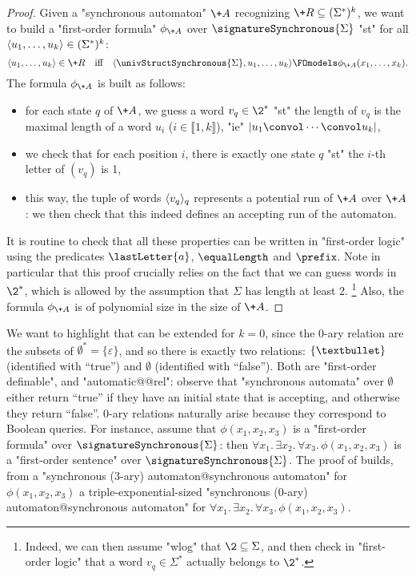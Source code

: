 \begin{proof}
	Given a "synchronous automaton" $\+A$ recognizing $\+R \subseteq (\Sigma^*)^k$,
	we want to build a "first-order formula" $\phi_{\+A}$ over $\signatureSynchronous{\Sigma}$
	"st" for all $\langle u_1,\dotsc, u_k\rangle \in (\Sigma^*)^k$:
	\[
		\tup{u_1,\dotsc, u_k} \in \+R
		\quad\text{iff}\quad
		\tup{\univStructSynchronous{\Sigma}, u_1,\dotsc, u_k} \FOmodels \phi_{\+A}(x_1,\dotsc,x_k).
	\]
	The formula $\phi_{\+A}$ is built as follows:
	\begin{itemize}
		\item for each state $q$ of $\+A$, we guess a word $v_q \in \2^*$ "st"
			the length of $v_q$ is the maximal length of a word $u_i$ ($i \in \lBrack 1,k\rBrack$),
			"ie" $|u_1 \convol \cdots \convol u_k|$,
		\item we check that for each position $i$, there is exactly one state $q$
			"st" the $i$-th letter of $(v_q)$ is 1,
		\item this way, the tuple of words $\langle v_q\rangle_{q}$ represents a potential run of $\+A$
			over $\+A$: we then check that this indeed defines an accepting run of the automaton. 
	\end{itemize}
	It is routine to check that all these properties can be written in "first-order logic"
	using the predicates $\lastLetter{a}$, $\equalLength$ and $\prefix$.
	Note in particular that this proof crucially relies on the fact that we can guess words
	in $\2^*$, which is allowed by the assumption that $\Sigma$ has length at least 2.%
	\footnote{Indeed, we can then assume "wlog" that $\2 \subseteq \Sigma$, and then
	check in "first-order logic" that a word $v_q \in \Sigma^*$ actually
	belongs to $\2^*$.}
	Also, the formula $\phi_{\+A}$ is of polynomial size in the size of $\+A$.
\end{proof}

We want to highlight that  can be extended for $k=0$,
since the $0$-ary relation are the subsets of $\emptyset^* = \{\varepsilon\}$,
and so there is exactly two 
relations: $\{\textbullet\}$ (identified with ``true'') and $\emptyset$ (identified with ``false'').
Both are "first-order definable", and "automatic@@rel": observe that "synchronous automata" over
$\emptyset$ either return ``true'' if they have an initial state that is accepting, and otherwise they return ``false''.
$0$-ary relations naturally arise because they correspond to Boolean queries.
For instance, assume that $\phi(x_1,x_2,x_3)$ is a "first-order formula" over
$\signatureSynchronous{\Sigma}$: then
$\forall x_1.\, \exists x_2.\, \forall x_3.\, \phi(x_1,x_2,x_3)$ is a "first-order sentence"
over $\signatureSynchronous{\Sigma}$. The proof of 
builds, from a "synchronous ($3$-ary) automaton@synchronous automaton" for
$\phi(x_1,x_2,x_3)$ a triple-exponential-sized "synchronous ($0$-ary) automaton@synchronous automaton" for $\forall x_1.\, \exists x_2.\, \forall x_3.\, \phi(x_1,x_2,x_3)$.

